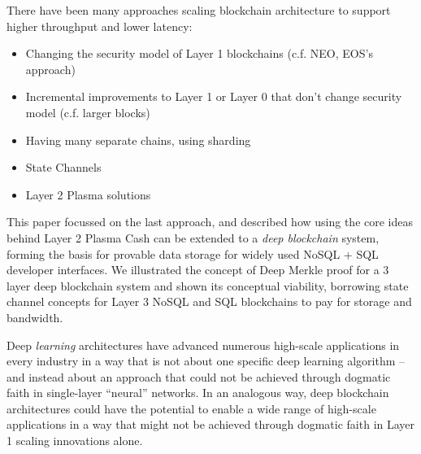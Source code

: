 \documentclass{article}
\begin{document}
There have been many approaches scaling blockchain architecture to support higher throughput and lower latency:

\begin{itemize}
\item Changing the security model of Layer 1 blockchains (c.f. NEO, EOS's approach)

\item Incremental improvements to Layer 1 or Layer 0 that don't change security model (c.f. larger blocks)

\item Having many separate chains, using sharding

\item State Channels

\item Layer 2 Plasma solutions
\end{itemize}

This paper focussed on the last approach, and described how using the core ideas behind Layer 2 Plasma Cash can be extended to a {\em deep blockchain} system, forming the basis for provable data storage for widely used NoSQL + SQL developer interfaces.  We illustrated the concept of Deep Merkle proof for a 3 layer deep blockchain system and shown its conceptual viability, borrowing state channel concepts for Layer 3 NoSQL and SQL blockchains to pay for storage and bandwidth.

Deep {\em learning} architectures have advanced numerous high-scale applications in every industry in a way that is not about one specific deep learning algorithm -- and instead about an approach that could not be achieved through dogmatic faith in single-layer ``neural'' networks.   In an analogous way, deep blockchain architectures could have the potential to enable a wide range of high-scale applications in a way that might not be achieved through dogmatic faith in Layer 1 scaling innovations alone.
\end{document}
